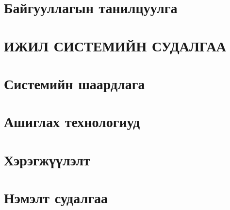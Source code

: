 \chapter{Байгууллагын танилцуулга}

\chapter{ИЖИЛ СИСТЕМИЙН СУДАЛГАА}

\chapter{Системийн шаардлага}

\chapter{Ашиглах технологиуд}

\chapter{Хэрэгжүүлэлт}

\chapter{Нэмэлт судалгаа}

